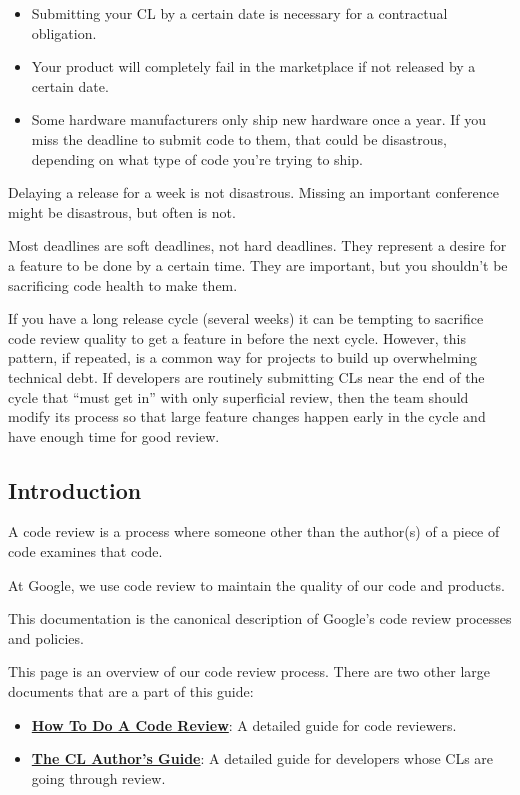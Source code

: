 \documentclass[
]{article}
\providecommand{\tightlist}{%
  \setlength{\itemsep}{0pt}\setlength{\parskip}{0pt}}
\begin{document}
\begin{itemize}
\tightlist
\item
  Submitting your CL by a certain date is necessary for a contractual
  obligation.
\item
  Your product will completely fail in the marketplace if not released
  by a certain date.
\item
  Some hardware manufacturers only ship new hardware once a year. If you
  miss the deadline to submit code to them, that could be disastrous,
  depending on what type of code you're trying to ship.
\end{itemize}

Delaying a release for a week is not disastrous. Missing an important
conference might be disastrous, but often is not.

Most deadlines are soft deadlines, not hard deadlines. They represent a
desire for a feature to be done by a certain time. They are important,
but you shouldn't be sacrificing code health to make them.

If you have a long release cycle (several weeks) it can be tempting to
sacrifice code review quality to get a feature in before the next cycle.
However, this pattern, if repeated, is a common way for projects to
build up overwhelming technical debt. If developers are routinely
submitting CLs near the end of the cycle that ``must get in'' with only
superficial review, then the team should modify its process so that
large feature changes happen early in the cycle and have enough time for
good review.

\subsection{Introduction}\label{intro}

A code review is a process where someone other than the author(s) of a
piece of code examines that code.

At Google, we use code review to maintain the quality of our code and
products.

This documentation is the canonical description of Google's code review
processes and policies.

This page is an overview of our code review process. There are two other
large documents that are a part of this guide:

\begin{itemize}
\tightlist
\item
  \textbf{\href{reviewer/index.md}{How To Do A Code Review}}: A detailed
  guide for code reviewers.
\item
  \textbf{\href{developer/index.md}{The CL Author's Guide}}: A detailed
  guide for developers whose CLs are going through review.
\end{itemize}
\end{document}
